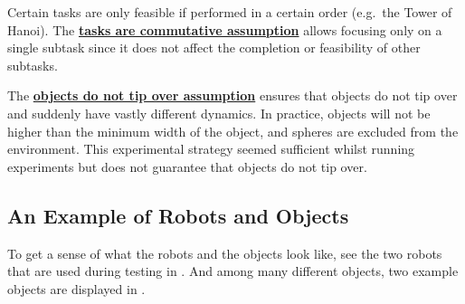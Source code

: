 Certain tasks are only feasible if performed in a certain order (e.g.~the Tower of Hanoi). The \hyperref[assumption:order_does_not_matter]{\textbf{tasks are commutative assumption}} allows focusing only on a single subtask since it does not affect the completion or feasibility of other subtasks.\bs

The \hyperref[assumption:no_tipping]{\textbf{objects do not tip over assumption}} ensures that objects do not tip over and suddenly have vastly different dynamics. In practice, objects will not be higher than the minimum width of the object, and spheres are excluded from the environment. This experimental strategy seemed sufficient whilst running experiments but does not guarantee that objects do not tip over.

\subsection{An Example of Robots and Objects}
To get a sense of what the robots and the objects look like, see the two robots that are used during testing in . And among many different objects, two example objects are displayed in .

